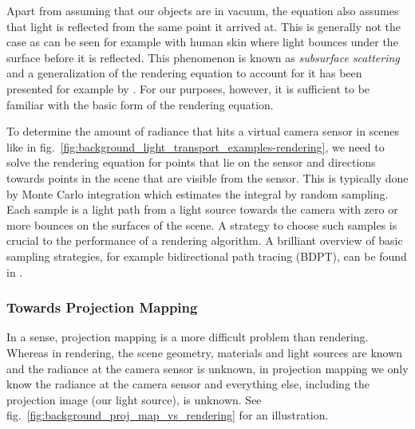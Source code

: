 Apart from assuming that our objects are in vacuum, the equation also assumes that light is reflected from the same point it arrived at. This is generally not the case as can be seen for example with human skin where light bounces under the surface before it is reflected. This phenomenon is known as \textit{subsurface scattering} and a generalization of the rendering equation to account for it has been presented for example by \citet{Jensen2001}. For our purposes, however, it is sufficient to be familiar with the basic form of the rendering equation.

To determine the amount of radiance that hits a virtual camera sensor in scenes like in fig.~\ref{fig:background_light_transport_examples-rendering}, we need to solve the rendering equation for points that lie on the sensor and directions towards points in the scene that are visible from the sensor. This is typically done by Monte Carlo integration which estimates the integral by random sampling. Each sample is a light path from a light source towards the camera with zero or more bounces on the surfaces of the scene. A strategy to choose such samples is crucial to the performance of a rendering algorithm. A brilliant overview of basic sampling strategies, for example bidirectional path tracing (BDPT), can be found in \citet{Veach1997}.

\subsubsection{Towards Projection Mapping}
\label{section:background-projection_mapping-light_transport-towards_projection_mapping}

In a sense, projection mapping is a more difficult problem than rendering. Whereas in rendering, the scene geometry, materials and light sources are known and the radiance at the camera sensor is unknown, in projection mapping we only know the radiance at the camera sensor and everything else, including the projection image (our light source), is unknown. See fig.~\ref{fig:background_proj_map_vs_rendering} for an illustration.

